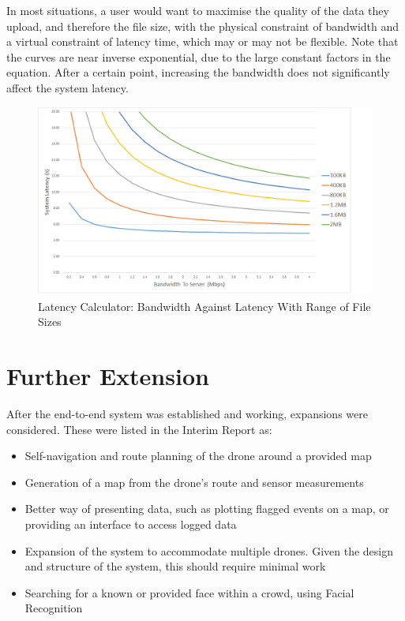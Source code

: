 \documentclass{article}
\begin{document}
In most situations, a user would want to maximise the quality of the data they upload, and therefore the file size, with the physical constraint of bandwidth and a virtual constraint of latency time, which may or may not be flexible. Note that the curves are near inverse exponential, due to the large constant factors in the equation. After a certain point, increasing the bandwidth does not significantly affect the system latency.

\begin{figure}[h]
\caption{Latency Calculator: Bandwidth Against Latency With Range of File Sizes\label{fig:LatencyVsBandwidth}}
\includegraphics[width=\textwidth]{LatencyVsBandwidth}
\end{figure}


\section{Further Extension}
After the end-to-end system was established and working, expansions were considered. These were listed in the Interim Report as:
\begin{itemize}
    \item Self-navigation and route planning of the drone around a provided map
    \item Generation of a map from the drone's route and sensor measurements
    \item Better way of presenting data, such as plotting flagged events on a map, or providing an interface to access logged data
    \item Expansion of the system to accommodate multiple drones. Given the design and structure of the system, this should require minimal work
    \item Searching for a known or provided face within a crowd, using Facial Recognition
\end{itemize}
\end{document}
